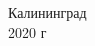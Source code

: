 \begin{titlepage}
	
	
	\vspace{\fill}
	
	\begin{center}
		Калининград \\
		2020 г
	\end{center}
	
\end{titlepage}